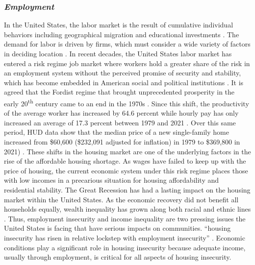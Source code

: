 \subsubsection{\textit{Employment}}

In the United States, the labor market is the result of cumulative individual behaviors including geographical migration and educational investments \citep{wiener_labor_2020}. The demand for labor is driven by firms, which must consider a wide variety of factors in deciding location \citep{partridge_persistent_2007}. In recent decades, the United States labor market has entered a risk regime job market where workers hold a greater share of the risk in an employment system without the perceived promise of security and stability, which has become embedded in American social and political institutions \citep{lowe_perceived_2018}. It is agreed that the Fordist regime that brought unprecedented prosperity in the early 20\textsuperscript{th} century came to an end in the 1970s \citep{stockhammer_stylized_2008}. Since this shift, the productivity of the average worker has increased by 64.6 percent while hourly pay has only increased an average of 17.3 percent between 1979 and 2021 \citep{productivity-pay-gap_2022}. Over this same period, HUD data show that the median price of a new single-family home increased from \$60,600 (\$232,091 adjusted for inflation) in 1979 to \$369,800 in 2021) \citep{us_census_bureau_median_1963}. These shifts in the housing market are one of the underlying factors in the rise of the affordable housing shortage. As wages have failed to keep up with the price of housing, the current economic system under this risk regime places those with low incomes in a precarious situation for housing affordability and residential stability. The Great Recession has had a lasting impact on the housing market within the United States. As the economic recovery did not benefit all households equally, wealth inequality has grown along both racial and ethnic lines \citep{kochhar_wealth_2014}. Thus, employment insecurity and income inequality are two pressing issues the United States is facing that have serious impacts on communities. “housing insecurity has risen in relative lockstep with employment insecurity” \citep[48]{desmond_housing_2016-1}. Economic conditions play a significant role in housing insecurity because adequate income, usually through employment, is critical for all aspects of housing insecurity. 


